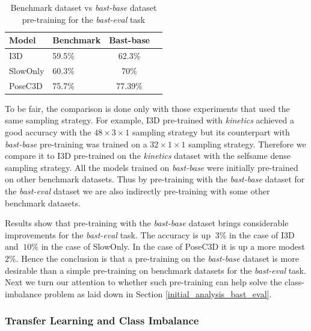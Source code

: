 \documentclass[extern,palatino]{cgMA}
\begin{document}
\begin{table}[h!]
  \begin{center}
    \caption{Benchmark dataset vs \textit{bast-base} dataset pre-training for the \textit{bast-eval} task}
    \label{tab:research_question_4_3}
    \begin{tabular}{l|l|c|c|}
      \textbf{Model} & \textbf{Benchmark} & \textbf{Bast-base}\\
      \hline
      \multirow{1}{*}{I3D} & 59.5\% & 62.3\% \\
       \hline
       \multirow{1}{*}{SlowOnly} & 60.3\% & 70\% \\
       \hline
       \multirow{1}{*}{PoseC3D} & 75.7\% &  77.39\%\\
       \hline
    \end{tabular}
  \end{center}
\end{table}

\noindent To be fair, the comparison is done only with those experiments that used the same sampling strategy. For example, I3D pre-trained with \textit{kinetics} achieved a good accuracy with the $48 \times 3 \times 1$ sampling strategy but its counterpart with \textit{bast-base} pre-training was trained on a $32 \times 1 \times 1$ sampling strategy. Therefore we compare it to I3D pre-trained on the \textit{kinetics} dataset with the selfsame dense sampling strategy. All the models trained on \textit{bast-base} were initially pre-trained on other benchmark datasets. Thus by pre-training with the \textit{bast-base} dataset for the \textit{bast-eval} dataset we are also indirectly pre-training with some other benchmark datasets.

Results show that pre-training with the \textit{bast-base} dataset brings considerable improvements for the \textit{bast-eval} task. The accuracy is up $~3\%$ in the case of I3D and $~10\%$ in the case of SlowOnly. In the case of PoseC3D it is up a more modest $2\%$. Hence the conclusion is that a pre-training on the \textit{bast-base} dataset is more desirable than a simple pre-training on benchmark datasets for the \textit{bast-eval} task. Next we turn our attention to whether such pre-training can help solve the class-imbalance problem as laid down in Section \ref{initial_analysis_bast_eval}.


\subsubsection{Transfer Learning and Class Imbalance}
\label{research_question_4_4}
\end{document}
